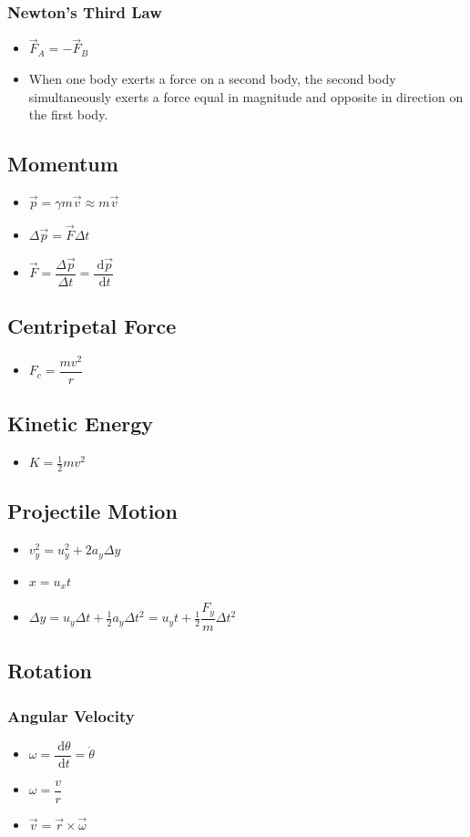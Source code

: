 \documentclass[]{report}
\newcommand \tab[1][1cm]{\hspace*{#1}}
\newcommand{\dn}[1]{\ \mathrm{d}#1}
\newcommand{\dd}[2]{ \dfrac{\dn #1}{\dn #2}}
\newcommand{\itemt}{\item \tab}
\begin{document}
\subsubsection{Newton's Third Law}
\begin{itemize}
\itemt \(\vec{F}_A = -\vec{F}_B	\) 
\item When one body exerts a force on a second body, the second body simultaneously exerts a force equal in magnitude and opposite in direction on the first body.
\end{itemize}			

\subsection{Momentum}
\begin{itemize}
\itemt \( \vec{p} = \gamma m\vec{v} \approx m\vec{v}\)
\itemt \( \Delta\vec{p} = \vec{F} \Delta t \)
\itemt \(\vec{F} = \dfrac{\Delta \vec{p}}{\Delta t} = \dd{\vec{p}}{t} \)
\end{itemize}

\subsection{Centripetal Force}
\begin{itemize}
\itemt \(F_c = \dfrac{mv^2}{r}\)
\end{itemize}		

\subsection{Kinetic Energy}	
\begin{itemize}
\itemt \( K = \frac{1}{2} mv^2 \)
\end{itemize}

\subsection{Projectile Motion}		
\begin{itemize}
\itemt \(v_y^2 = u_y^2 + 2a_y\Delta y \)
\itemt \( x = u_xt \)
\itemt \(\Delta y = u_y \Delta t + \frac{1}{2} a_y \Delta t^2 = u_y t + \frac{1}{2} \dfrac{F_{y}}{m} \Delta t^2\)
\end{itemize}	


\subsection{Rotation}

\subsubsection{Angular Velocity}
\begin{itemize}
\itemt \( \omega = \dd{\theta}{t} = \dot{\theta} \)
\itemt \( \omega = \dfrac{v}{r} \)
\itemt \( \vec{v} = \vec{r} \times \vec{\omega} \)
\end{itemize}
\end{document}
